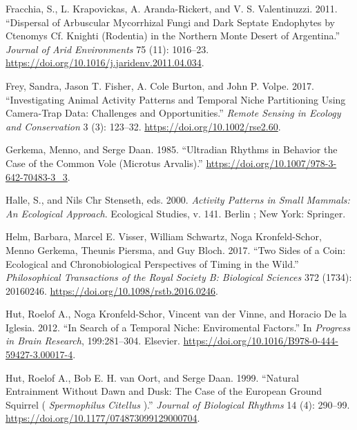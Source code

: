 \documentclass[msc,numbers,hidelinks]{coppe}
\newlength{\cslhangindent}
\newenvironment{cslreferences}%
  {\setlength{\parindent}{0pt}%
  \everypar{\setlength{\hangindent}{\cslhangindent}}\ignorespaces}%
  {\par}
\begin{document}
\begin{cslreferences}
  \leavevmode\hypertarget{ref-fracchiaDispersalArbuscularMycorrhizal2011}{}%
  Fracchia, S., L. Krapovickas, A. Aranda-Rickert, and V. S. Valentinuzzi. 2011. ``Dispersal of Arbuscular Mycorrhizal Fungi and Dark Septate Endophytes by Ctenomys Cf. Knighti (Rodentia) in the Northern Monte Desert of Argentina.'' \emph{Journal of Arid Environments} 75 (11): 1016--23. \url{https://doi.org/10.1016/j.jaridenv.2011.04.034}.

  \leavevmode\hypertarget{ref-freyInvestigatingAnimalActivity2017}{}%
  Frey, Sandra, Jason T. Fisher, A. Cole Burton, and John P. Volpe. 2017. ``Investigating Animal Activity Patterns and Temporal Niche Partitioning Using Camera-Trap Data: Challenges and Opportunities.'' \emph{Remote Sensing in Ecology and Conservation} 3 (3): 123--32. \url{https://doi.org/10.1002/rse2.60}.

  \leavevmode\hypertarget{ref-gerkemaUltradianRhythmsBehavior1985}{}%
  Gerkema, Menno, and Serge Daan. 1985. ``Ultradian Rhythms in Behavior the Case of the Common Vole (Microtus Arvalis).'' \url{https://doi.org/10.1007/978-3-642-70483-3_3}.

  \leavevmode\hypertarget{ref-halleActivityPatternsSmall2000}{}%
  Halle, S., and Nils Chr Stenseth, eds. 2000. \emph{Activity Patterns in Small Mammals: An Ecological Approach}. Ecological Studies, v. 141. Berlin ; New York: Springer.

  \leavevmode\hypertarget{ref-helmTwoSidesCoin2017}{}%
  Helm, Barbara, Marcel E. Visser, William Schwartz, Noga Kronfeld-Schor, Menno Gerkema, Theunis Piersma, and Guy Bloch. 2017. ``Two Sides of a Coin: Ecological and Chronobiological Perspectives of Timing in the Wild.'' \emph{Philosophical Transactions of the Royal Society B: Biological Sciences} 372 (1734): 20160246. \url{https://doi.org/10.1098/rstb.2016.0246}.

  \leavevmode\hypertarget{ref-hutSearchTemporalNiche2012}{}%
  Hut, Roelof A., Noga Kronfeld-Schor, Vincent van der Vinne, and Horacio De la Iglesia. 2012. ``In Search of a Temporal Niche: Enviromental Factors.'' In \emph{Progress in Brain Research}, 199:281--304. Elsevier. \url{https://doi.org/10.1016/B978-0-444-59427-3.00017-4}.

  \leavevmode\hypertarget{ref-hutNaturalEntrainmentDawn1999}{}%
  Hut, Roelof A., Bob E. H. van Oort, and Serge Daan. 1999. ``Natural Entrainment Without Dawn and Dusk: The Case of the European Ground Squirrel ( \emph{Spermophilus} \emph{Citellus} ).'' \emph{Journal of Biological Rhythms} 14 (4): 290--99. \url{https://doi.org/10.1177/074873099129000704}.


\end{cslreferences}
\end{document}
